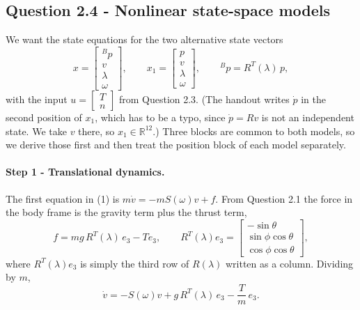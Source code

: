 \subsection*{Question 2.4 - Nonlinear state-space models}

We want the state equations for the two alternative state vectors
\begin{equation*}
x = \begin{bmatrix} {}^B p \\ v \\ \lambda \\ \omega \end{bmatrix}, \qquad
x_1 = \begin{bmatrix} p \\ v \\ \lambda \\ \omega \end{bmatrix}, \qquad
{}^B p = R^T(\lambda)\, p,
\end{equation*}
with the input $u = \begin{bmatrix} T \\ n \end{bmatrix}$ from Question 2.3.
(The handout writes $\dot p$ in the second position of $x_1$, which has to be a typo, since $\dot p = R v$ is not an independent state. We take $v$ there, so $x_1 \in \mathbb{R}^{12}$.)
Three blocks are common to both models, so we derive those first and then treat the position block of each model separately.

\paragraph{Step 1 - Translational dynamics.}
The first equation in (1) is $m\dot v = -m S(\omega) v + f$.
From Question 2.1 the force in the body frame is the gravity term plus the thrust term,
\begin{equation*}
f = m g\, R^T(\lambda)\, e_3 - T e_3, \qquad
R^T(\lambda) e_3 = \begin{bmatrix} -\sin\theta \\ \sin\phi\cos\theta \\ \cos\phi\cos\theta \end{bmatrix},
\end{equation*}
where $R^T(\lambda) e_3$ is simply the third row of $R(\lambda)$ written as a column.
Dividing by $m$,
\begin{equation*}
\dot v = -S(\omega) v + g\, R^T(\lambda)\, e_3 - \frac{T}{m}\, e_3 .
\end{equation*}


